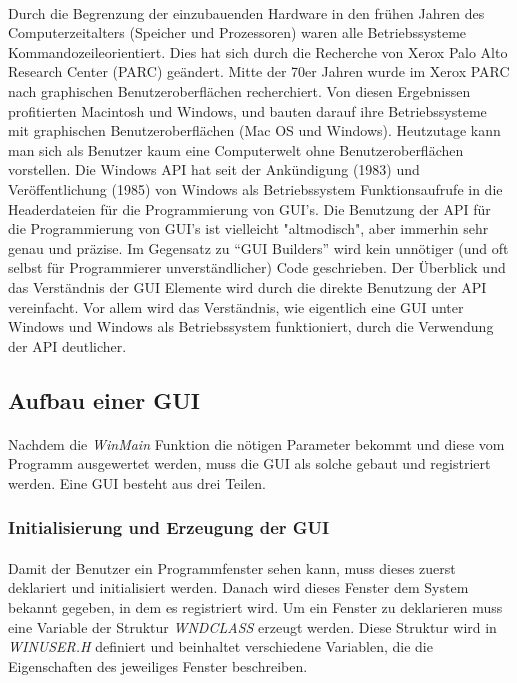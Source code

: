 \paragraph{}
Durch die Begrenzung der einzubauenden Hardware in den frühen Jahren des Computerzeitalters (Speicher und Prozessoren) waren alle Betriebssysteme Kommandozeileorientiert. Dies hat sich durch die Recherche von Xerox Palo Alto Research Center (PARC) geändert. Mitte der 70er Jahren wurde im Xerox PARC nach graphischen Benutzeroberflächen recherchiert. Von diesen Ergebnissen profitierten Macintosh und Windows, und bauten darauf ihre Betriebssysteme mit graphischen Benutzeroberflächen (Mac OS und Windows). Heutzutage kann man sich als Benutzer kaum eine Computerwelt ohne Benutzeroberflächen vorstellen. Die Windows API hat seit der Ankündigung (1983) und Veröffentlichung (1985) von Windows als Betriebssystem Funktionsaufrufe in die Headerdateien für die Programmierung von GUI's. Die Benutzung der API für die Programmierung von GUI's ist vielleicht "altmodisch", aber immerhin sehr genau und präzise. Im Gegensatz zu "`GUI Builders"' wird kein unnötiger (und oft selbst für Programmierer unverständlicher) Code geschrieben. Der Überblick und das Verständnis der GUI Elemente wird durch die direkte Benutzung der API vereinfacht. Vor allem wird das Verständnis, wie eigentlich eine GUI unter Windows und Windows als Betriebssystem funktioniert, durch die Verwendung der API deutlicher.

\subsection{Aufbau einer GUI}
\paragraph{}
Nachdem die \textit{WinMain} Funktion die nötigen Parameter bekommt und diese vom Programm ausgewertet werden, muss die GUI als solche gebaut und registriert werden. Eine GUI besteht aus drei Teilen.


\subsubsection{Initialisierung und Erzeugung der GUI}\label{Ini und Erzeugung}
\paragraph{}
Damit der Benutzer ein Programmfenster sehen kann, muss dieses zuerst deklariert und initialisiert werden. Danach wird dieses Fenster dem System bekannt gegeben, in dem es registriert wird. Um ein Fenster zu deklarieren muss eine Variable der Struktur \textit{WNDCLASS} erzeugt werden. Diese Struktur wird in \textit{WINUSER.H} definiert und beinhaltet verschiedene Variablen, die die Eigenschaften des jeweiliges Fenster beschreiben.



